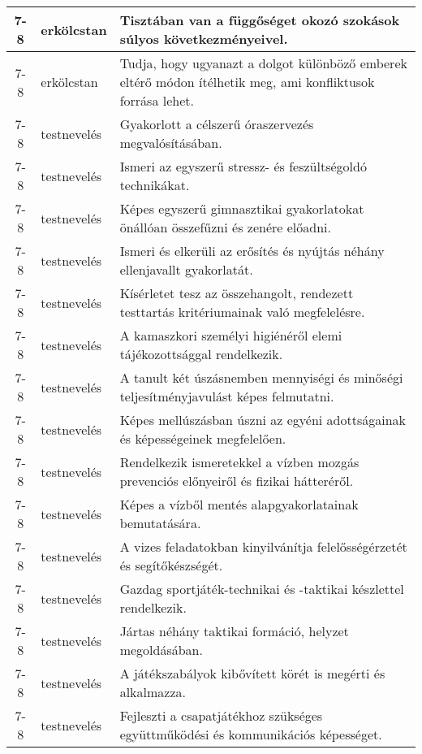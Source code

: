 \begin{small}
\begin{longtable}{c | p{2cm} |  p{11cm} }
              7-8 & erkölcstan & Tisztában van a függőséget okozó szokások súlyos következményeivel. \\ \hline
              7-8 & erkölcstan & Tudja, hogy ugyanazt a dolgot különböző emberek eltérő módon ítélhetik meg, ami konfliktusok forrása lehet. \\ \hline
              7-8 & testnevelés & Gyakorlott a célszerű óraszervezés megvalósításában. \\ \hline
              7-8 & testnevelés & Ismeri az egyszerű stressz- és feszültségoldó technikákat. \\ \hline
              7-8 & testnevelés & Képes egyszerű gimnasztikai gyakorlatokat önállóan összefűzni és zenére előadni. \\ \hline
              7-8 & testnevelés & Ismeri és elkerüli az erősítés és nyújtás néhány ellenjavallt gyakorlatát. \\ \hline
              7-8 & testnevelés & Kísérletet tesz az összehangolt, rendezett testtartás kritériumainak való megfelelésre. \\ \hline
              7-8 & testnevelés & A kamaszkori személyi higiénéről elemi tájékozottsággal rendelkezik. \\ \hline
              7-8 & testnevelés & A tanult két úszásnemben mennyiségi és minőségi teljesítményjavulást képes felmutatni. \\ \hline
              7-8 & testnevelés & Képes mellúszásban úszni az egyéni adottságainak és képességeinek megfelelően. \\ \hline
              7-8 & testnevelés & Rendelkezik ismeretekkel a vízben mozgás prevenciós előnyeiről és fizikai hátteréről. \\ \hline
              7-8 & testnevelés & Képes a vízből mentés alapgyakorlatainak bemutatására. \\ \hline
              7-8 & testnevelés & A vizes feladatokban kinyilvánítja felelősségérzetét és segítőkészségét. \\ \hline
              7-8 & testnevelés & Gazdag sportjáték-technikai és -taktikai készlettel rendelkezik. \\ \hline
              7-8 & testnevelés & Jártas néhány taktikai formáció, helyzet megoldásában. \\ \hline
              7-8 & testnevelés & A játékszabályok kibővített körét is megérti és alkalmazza. \\ \hline
              7-8 & testnevelés & Fejleszti a csapatjátékhoz szükséges együttműködési és kommunikációs képességet. \\ \hline

\end{longtable}
\end{small}
